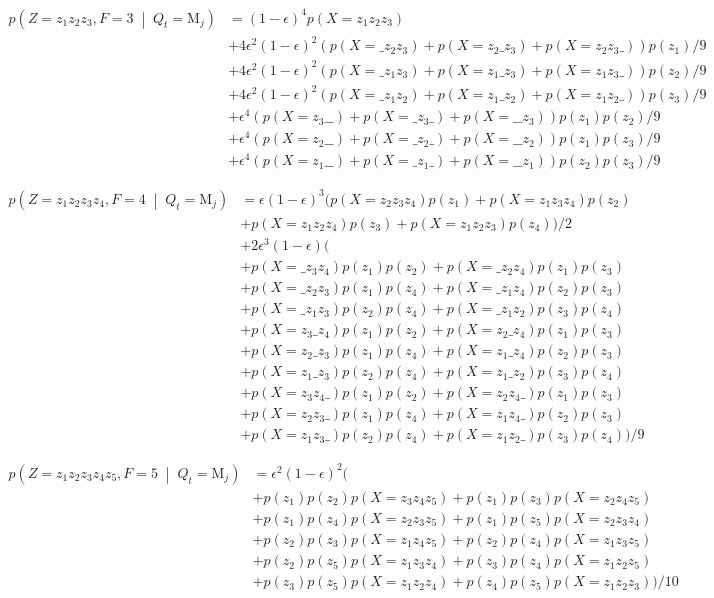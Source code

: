 \documentclass[a4paper]{article}
\theoremstyle{definition}
\theoremstyle{definition}
\newcommand{\cprob}[2]{p\left(#1\;\middle|\; #2\right)}
\newcommand{\eps}{\epsilon}
\newcommand{\s}{\texttt{\char`_}}
\begin{document}
\begin{align*}
    \cprob{Z=z_1z_2z_3,F=3}{Q_t=\mathrm M_j} &= (1-\eps)^4 p(X=z_1z_2z_3)\\
        &+ 4\eps^2(1-\eps)^2 (p(X=\s z_2 z_3) + p(X=z_2\s z_3) + p(X=z_2 z_3\s))p(z_1)/9\\
        &+ 4\eps^2(1-\eps)^2 (p(X=\s z_1 z_3) + p(X=z_1\s z_3) + p(X=z_1 z_3\s))p(z_2)/9\\
        &+ 4\eps^2(1-\eps)^2 (p(X=\s z_1 z_2) + p(X=z_1\s z_2) + p(X=z_1 z_2\s))p(z_3)/9\\
        &+ \eps^4 (p(X=z_3\s\s) + p(X=\s z_3\s) + p(X=\s\s z_3))p(z_1)p(z_2)/9\\
        &+ \eps^4 (p(X=z_2\s\s) + p(X=\s z_2\s) + p(X=\s\s z_2))p(z_1)p(z_3)/9\\
        &+ \eps^4 (p(X=z_1\s\s) + p(X=\s z_1\s) + p(X=\s\s z_1))p(z_2)p(z_3)/9
\end{align*}

\begin{align*}
    \cprob{Z=z_1z_2z_3z_4,F=4}{Q_t=\mathrm M_j} &= \eps(1-\eps)^3 (p(X=z_2z_3z_4)p(z_1)+p(X=z_1z_3z_4)p(z_2)\\
    &+p(X=z_1z_2z_4)p(z_3)+p(X=z_1z_2z_3)p(z_4))/2\\
    &+2\eps^3(1-\eps)(\\
    &+p(X=\s z_3z_4)p(z_1)p(z_2) + p(X=\s z_2z_4)p(z_1)p(z_3)\\
    &+ p(X=\s z_2z_3)p(z_1)p(z_4) + p(X=\s z_1z_4)p(z_2)p(z_3)\\
    &+ p(X=\s z_1z_3)p(z_2)p(z_4) + p(X=\s z_1z_2)p(z_3)p(z_4)\\
    &+ p(X=z_3\s z_4)p(z_1)p(z_2) + p(X=z_2\s z_4)p(z_1)p(z_3)\\
    &+ p(X=z_2\s z_3)p(z_1)p(z_4) + p(X=z_1\s z_4)p(z_2)p(z_3)\\
    &+ p(X=z_1\s z_3)p(z_2)p(z_4) + p(X=z_1\s z_2)p(z_3)p(z_4)\\
    &+ p(X=z_3z_4\s)p(z_1)p(z_2) + p(X=z_2z_4\s)p(z_1)p(z_3)\\
    &+ p(X=z_2z_3\s)p(z_1)p(z_4) + p(X=z_1z_4\s)p(z_2)p(z_3)\\
    &+ p(X=z_1z_3\s)p(z_2)p(z_4) + p(X=z_1z_2\s)p(z_3)p(z_4))/9
\end{align*}

\begin{align*}
    \cprob{Z=z_1z_2z_3z_4z_5,F=5}{Q_t=\mathrm M_j}
        &= \eps^2(1-\eps)^2(\\
        &+p(z_1)p(z_2)p(X=z_3z_4z_5)+p(z_1)p(z_3)p(X=z_2z_4z_5)\\
        &+p(z_1)p(z_4)p(X=z_2z_3z_5)+p(z_1)p(z_5)p(X=z_2z_3z_4)\\
        &+p(z_2)p(z_3)p(X=z_1z_4z_5)+p(z_2)p(z_4)p(X=z_1z_3z_5)\\
        &+p(z_2)p(z_5)p(X=z_1z_3z_4)+p(z_3)p(z_4)p(X=z_1z_2z_5)\\
        &+p(z_3)p(z_5)p(X=z_1z_2z_4)+p(z_4)p(z_5)p(X=z_1z_2z_3))/10
\end{align*}
\end{document}
